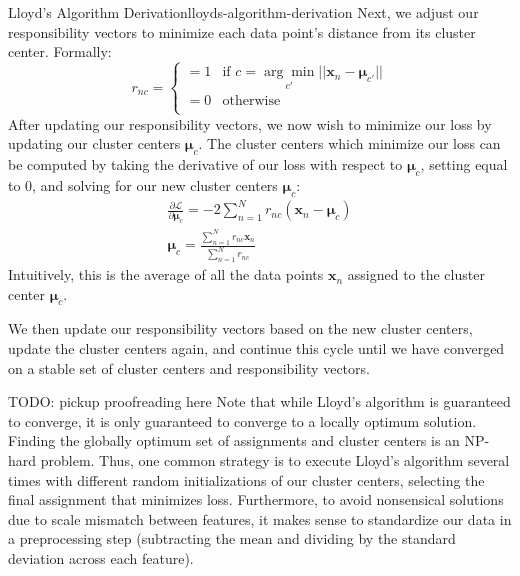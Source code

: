 \begin{derivation}{Lloyd's Algorithm Derivation}{lloyds-algorithm-derivation}
	Next, we adjust our responsibility vectors to minimize each data point's distance from its cluster center. Formally:
	\begin{equation} \label{responsibility-vector-update}
		r_{nc} = \begin{cases}
		 	= 1 & \text{if $c = \underset{c'}{\arg\min} ||\textbf{x}_{n} - \boldsymbol{\mu}_{c'}||$} \\
			= 0 & \text{otherwise} \\
		\end{cases}
	\end{equation}
	After updating our responsibility vectors, we now wish to minimize our loss by updating our cluster centers $\boldsymbol{\mu}_{c}$. The cluster centers which minimize our loss can be computed by taking the derivative of our loss with respect to $\boldsymbol{\mu}_{c}$, setting equal to 0, and solving for our new cluster centers $\boldsymbol{\mu}_{c}$:
	\begin{equation} \label{update-cluster-centers}
		\begin{aligned}
			\frac{\partial \mathcal{L}}{\partial \boldsymbol{\mu}_{c}} = -2 \sum_{n=1}^{N} r_{nc} (\textbf{x}_{n} - \boldsymbol{\mu}_{c}) \\
			\boldsymbol{\mu}_{c} = \frac{\sum_{n=1}^{N} r_{nc} \textbf{x}_{n}}{\sum_{n=1}^{N} r_{nc}}
		\end{aligned}
	\end{equation}
	Intuitively, this is the average of all the data points $\textbf{x}_{n}$ assigned to the cluster center $\boldsymbol{\mu}_{c}$. \newline

	We then update our responsibility vectors based on the new cluster centers, update the cluster centers again, and continue this cycle until we have converged on a stable set of cluster centers and responsibility vectors.
\end{derivation}

TODO: pickup proofreading here \newline
Note that while Lloyd's algorithm is guaranteed to converge, it is only guaranteed to converge to a locally optimum solution. Finding the globally optimum set of assignments and cluster centers is an NP-hard problem. Thus, one common strategy is to execute Lloyd's algorithm several times with different random initializations of our cluster centers, selecting the final assignment that minimizes loss. Furthermore, to avoid nonsensical solutions due to scale mismatch between features, it makes sense to standardize our data in a preprocessing step (subtracting the mean and dividing by the standard deviation across each feature).

